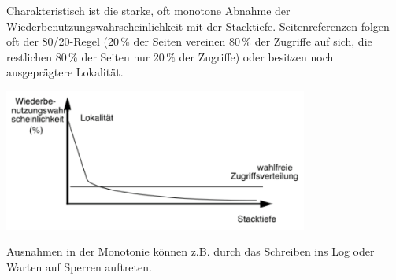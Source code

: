 \begin{enumerate}[a)]
\begin{solution}
Charakteristisch ist die starke, oft monotone Abnahme der Wiederbenutzungswahrscheinlichkeit mit der Stacktiefe.
Seitenreferenzen folgen oft der 80/20-Regel (20\,\% der Seiten vereinen 80\,\% der Zugriffe auf sich, die restlichen 80\,\% der Seiten nur 20\,\% der Zugriffe) oder besitzen noch ausgeprägtere Lokalität.

\begin{center}
\includegraphics[width = 10cm]{Pictures/Ue07_Aufgabe2_Zusatz2.png}
\end{center}

Ausnahmen in der Monotonie können z.B. durch das Schreiben ins Log oder Warten auf Sperren auftreten.
\end{solution}

%
%


\end{enumerate}
